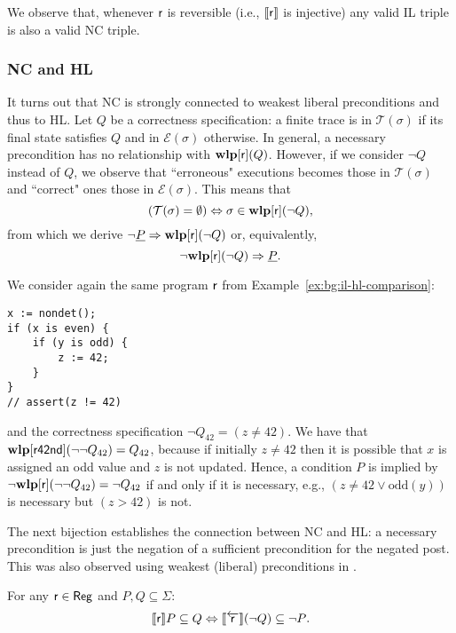 We observe that, whenever $\mathsf{r}$ is reversible (i.e., $\llbracket\mathsf{r}\rrbracket$ is injective) any valid IL triple is also a valid NC triple.

\subsubsection{NC and HL}
It turns out that NC is strongly connected to weakest liberal preconditions and thus to HL.
Let $Q$ be a correctness specification: a finite trace is in $\mathcal{T}(\sigma)$ if its final state satisfies $Q$ and in $\mathcal{E}(\sigma)$ otherwise.
In general, a necessary precondition has no relationship with $\textbf{wlp}[\mathsf{r}](Q)$. However, if we consider $\lnot Q$ instead of $Q$, we observe that ``erroneous" executions becomes those in $\mathcal{T}(\sigma)$ and ``correct" ones those in $\mathcal{E}(\sigma)$. This means that
\[
(\mathcal{T}(\sigma) = \emptyset) \Leftrightarrow \sigma \in \textbf{wlp}[\mathsf{r}](\lnot Q),
\]
from which we derive
\(\lnot \underline{P} \Rightarrow \textbf{wlp}[\mathsf{r}](\lnot Q)\)
or, equivalently,
\[\lnot \textbf{wlp}[\mathsf{r}](\lnot Q) \Rightarrow \underline{P} .\]

\begin{example}
	We consider again the same program $\mathsf{r}$ from Example~\ref{ex:bg:il-hl-comparison}:

	\begin{verbatim}
x := nondet();
if (x is even) {
	if (y is odd) {
		z := 42;
	}
}
// assert(z != 42)
	\end{verbatim}

	\noindent
	and the correctness specification $\neg Q_{42} = (z\neq 42)$. We have that $\textbf{wlp}[\mathsf{r42nd}](\lnot \lnot Q_{42}) = Q_{42}$, because if initially $z \neq 42$ then it is possible that $x$ is assigned an odd value and $z$ is not updated.
	Hence, a condition $P$ is implied by $\lnot \textbf{wlp}[\mathsf{r}](\lnot\lnot Q_{42}) = \lnot Q_{42}$ if and only if it is necessary, e.g., $(z\neq 42 \vee \text{odd}(y))$ is necessary but $(z > 42)$ is not.
\end{example}

The next bijection establishes the connection between NC and HL: a necessary precondition is just the negation of a sufficient precondition for the negated post. This was also observed using weakest (liberal) preconditions in \cite[Theorem~5.4]{ZK22}.

\begin{prop}\label{prop:sil:fw-inclusion-negation-bw}
	For any  $\mathsf{r}\in \mathsf{Reg}$ and $P, Q \subseteq \Sigma$:
	\[
	\llbracket\mathsf{r}\rrbracket P \subseteq Q \Leftrightarrow \llbracket\overleftarrow{\mathsf{r}}\rrbracket (\lnot Q) \subseteq \lnot P \text{.}
	\]
\end{prop}


